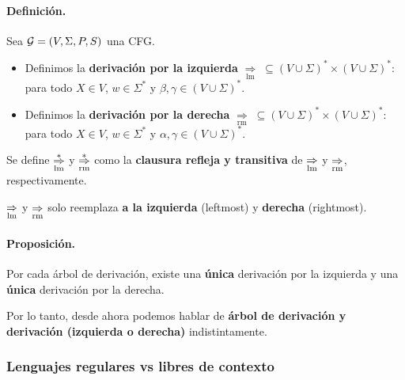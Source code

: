 \paragraph{Definición.} Sea $\mathcal{G} = (V, \Sigma, P, S)$ una CFG.
\begin{itemize}
    \item Definimos la \textbf{derivación por la izquierda} $\underset{\mathrm{lm}}{\Rightarrow} \; \subseteq(V \cup \Sigma)^* \times(V \cup \Sigma)^*$:
          para todo $X \in V$, $w \in \Sigma^*$ y $\beta,\gamma \in (V \cup \Sigma)^*$.

    \item Definimos la \textbf{derivación por la derecha} $\underset{\mathrm{rm}}{\Rightarrow} \; \subseteq(V \cup \Sigma)^* \times(V \cup \Sigma)^*$:
          para todo $X \in V$, $w \in \Sigma^*$ y $\alpha,\gamma \in (V\cup \Sigma)^*$.
\end{itemize}

Se define $\underset{\mathrm{lm}}{\overset{*}{\Rightarrow}}$ y $\underset{\mathrm{rm}}{\overset{*}{\Rightarrow}}$ como la \textbf{clausura refleja y transitiva} de $\underset{\mathrm{lm}}{\overset{}{\Rightarrow}}$ y $\underset{\mathrm{rm}}{\overset{}{\Rightarrow}}$, respectivamente.  \medbreak

$\underset{\mathrm{lm}}{\overset{}{\Rightarrow}}$ y $\underset{\mathrm{rm}}{\overset{}{\Rightarrow}}$ solo reemplaza \textbf{a la izquierda} (leftmost) y \textbf{derecha} (rightmost).


\paragraph{Proposición.} Por cada árbol de derivación, existe una \textbf{única} derivación por la izquierda y una \textbf{única} derivación por la derecha. \medbreak

Por lo tanto, desde ahora podemos hablar de \textbf{árbol de derivación y derivación (izquierda o derecha)} indistintamente.

\subsubsection{Lenguajes regulares vs libres de contexto}

